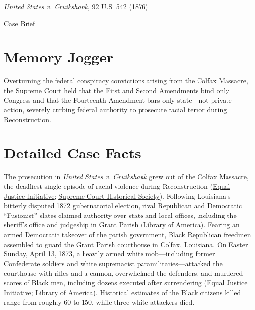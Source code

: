 \documentclass[12pt]{article}
\begin{document}
\begin{center}
{\LARGE \textit{United States v. Cruikshank}, 92 U.S. 542 (1876)\par}
\vspace{0.8em}
{\large Case Brief\par}
\end{center}
\vspace{1em}

\section{Memory Jogger}

Overturning the federal conspiracy convictions arising from the Colfax Massacre, the Supreme Court held that the First and Second Amendments bind only Congress and that the Fourteenth Amendment bars only state---not private---action, severely curbing federal authority to prosecute racial terror during Reconstruction.

\section{Detailed Case Facts}

The prosecution in \textit{United States v. Cruikshank} grew out of the Colfax Massacre, the deadliest single episode of racial violence during Reconstruction (\href{https://calendar.eji.org/racial-injustice/apr/13}{Equal Justice Initiative}; \href{https://civics.supremecourthistory.org/article/united-states-v-cruikshank/}{Supreme Court Historical Society}). Following Louisiana's bitterly disputed 1872 gubernatorial election, rival Republican and Democratic ``Fusionist'' slates claimed authority over state and local offices, including the sheriff's office and judgeship in Grant Parish (\href{https://storyoftheweek.loa.org/2023/04/the-colfax-massacre-trial.html}{Library of America}). Fearing an armed Democratic takeover of the parish government, Black Republican freedmen assembled to guard the Grant Parish courthouse in Colfax, Louisiana. On Easter Sunday, April 13, 1873, a heavily armed white mob---including former Confederate soldiers and white supremacist paramilitaries---attacked the courthouse with rifles and a cannon, overwhelmed the defenders, and murdered scores of Black men, including dozens executed after surrendering (\href{https://calendar.eji.org/racial-injustice/apr/13}{Equal Justice Initiative}; \href{https://storyoftheweek.loa.org/2023/04/the-colfax-massacre-trial.html}{Library of America}). Historical estimates of the Black citizens killed range from roughly 60 to 150, while three white attackers died.
\end{document}
